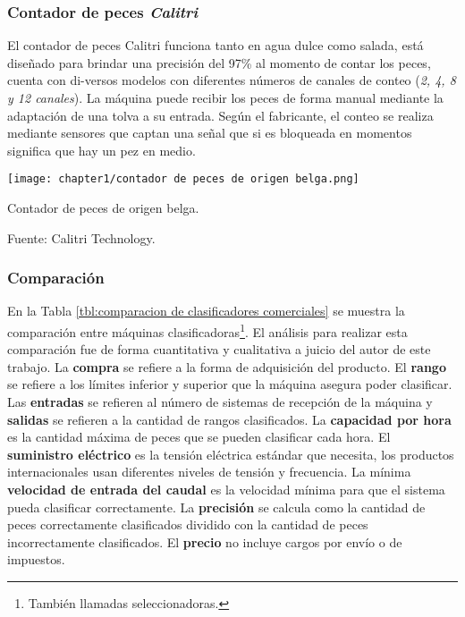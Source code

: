 \subsubsection{Contador de peces \textit{Calitri}}

El contador de peces Calitri funciona tanto en agua dulce como salada, está diseñado para brindar una precisión del 97\% al momento de contar los peces, cuenta con di-versos modelos con diferentes números de canales de conteo (\textit{2, 4, 8 y 12 canales}). La máquina puede recibir los peces de forma manual mediante la adaptación de una tolva a su entrada.\citep{Calitri2018} Según el fabricante, el conteo se realiza mediante sensores que captan una señal que si es bloqueada en momentos significa que hay un pez en medio.

\begin{myfigure}[H]
	\footnotesize\centering
	\texttt{[image: chapter1/contador de peces de origen belga.png]}
	\caption{Contador de peces de origen belga.}
	\begin{myflushcenter}			
		Fuente: Calitri Technology.
	\end{myflushcenter}
	\label{fig:contador de peces de origen belga}
\end{myfigure}

\subsubsection{Comparación}

En la Tabla \ref{tbl:comparacion de clasificadores comerciales} se muestra la comparación entre máquinas clasificadoras\footnote{También llamadas seleccionadoras.}. El análisis para realizar esta comparación fue de forma cuantitativa y cualitativa a juicio del autor de este trabajo. La \textbf{compra} se refiere a la forma de adquisición del producto. El \textbf{rango} se refiere a los límites inferior y superior que la máquina asegura poder clasificar. Las \textbf{entradas} se refieren al número de sistemas de recepción de la máquina y \textbf{salidas} se refieren a la cantidad de rangos clasificados. La \textbf{capacidad por hora} es la cantidad máxima de peces que se pueden clasificar cada hora. El \textbf{suministro eléctrico} es la tensión eléctrica estándar que necesita, los productos internacionales usan diferentes niveles de tensión y frecuencia.  La mínima \textbf{velocidad de entrada del caudal} es la velocidad mínima para que el sistema pueda clasificar correctamente. La \textbf{precisión} se calcula como la cantidad de peces correctamente clasificados dividido con la cantidad de peces incorrectamente clasificados. El \textbf{precio} no incluye cargos por envío o de impuestos.

